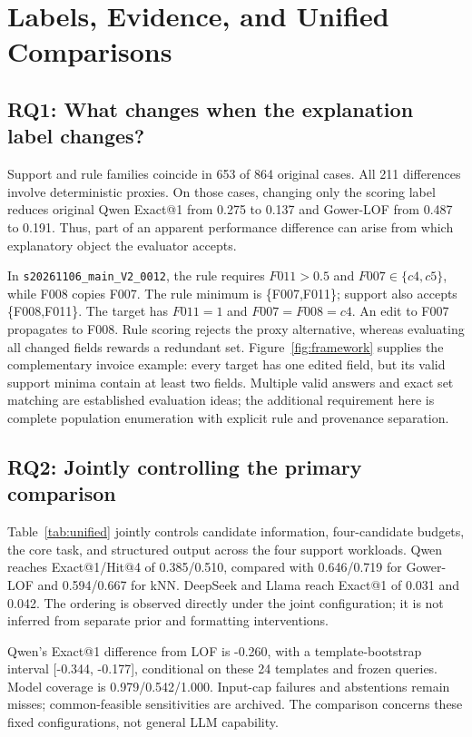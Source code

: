 \documentclass[conference]{IEEEtran}
\begin{document}
\section{Labels, Evidence, and Unified Comparisons}
\subsection{RQ1: What changes when the explanation label changes?}
Support and rule families coincide in 653 of 864 original cases. All 211 differences involve deterministic proxies. On those cases, changing only the scoring label reduces original Qwen Exact@1 from 0.275 to 0.137 and Gower-LOF from 0.487 to 0.191. Thus, part of an apparent performance difference can arise from which explanatory object the evaluator accepts.

In \texttt{s20261106\_main\_V2\_0012}, the rule requires $F011>0.5$ and $F007\in\{c4,c5\}$, while F008 copies F007. The rule minimum is \{F007,F011\}; support also accepts \{F008,F011\}. The target has $F011=1$ and $F007=F008=c4$. An edit to F007 propagates to F008. Rule scoring rejects the proxy alternative, whereas evaluating all changed fields rewards a redundant set. Figure~\ref{fig:framework} supplies the complementary invoice example: every target has one edited field, but its valid support minima contain at least two fields. Multiple valid answers and exact set matching are established evaluation ideas; the additional requirement here is complete population enumeration with explicit rule and provenance separation.

\subsection{RQ2: Jointly controlling the primary comparison}

Table~\ref{tab:unified} jointly controls candidate information, four-candidate budgets, the core task, and structured output across the four support workloads. Qwen reaches Exact@1/Hit@4 of 0.385/0.510, compared with 0.646/0.719 for Gower-LOF and 0.594/0.667 for kNN. DeepSeek and Llama reach Exact@1 of 0.031 and 0.042. The ordering is observed directly under the joint configuration; it is not inferred from separate prior and formatting interventions.

Qwen's Exact@1 difference from LOF is -0.260, with a template-bootstrap interval [-0.344, -0.177], conditional on these 24 templates and frozen queries. Model coverage is 0.979/0.542/1.000. Input-cap failures and abstentions remain misses; common-feasible sensitivities are archived. The comparison concerns these fixed configurations, not general LLM capability.
\end{document}
